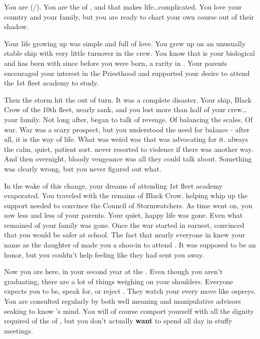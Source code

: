 \documentclass[char]{GL2020}
\begin{document}
\name{\cWarlordDaughter{}}

You are \cWarlordDaughter{} (\cWarlordDaughter{\They}/\cWarlordDaughter{\Them}). You are the \cWarlordDaughter{\child} of \cLoud{\full}, and that makes life\ldots complicated. You love your country and your family, but you are ready to chart your own course out of their shadow.

Your life growing up was simple and full of love. You grew up on an unusually stable ship with very little turnover in the crew. You know that \cLoud{} is your biological \cLoud{\parent} and has been with \cQuiet{\full} since before you were born, a rarity in \pShip{}. Your parents encouraged your interest in the Priesthood and supported your desire to attend the 1st fleet academy to study.

Then the storm hit the \pShip{} out of turn. It was a complete disaster. Your ship, Black Crow of the 10th fleet, nearly sank, and you lost more than half of your crew\ldots your family. Not long after, \cLoud{} began to talk of revenge. Of balancing the scales. Of war. War was a scary prospect, but you understood the need for balance - after all, it is the \pShippies{} way of life. What was weird was that \cLoud{} was advocating for it. \cLoud{\They} \cLoud{\were} always the calm, quiet, patient sort. \cLoud{\They} never resorted to violence if there was another way. And then overnight, bloody vengeance was all they could talk about. Something was clearly wrong, but you never figured out what.

In the wake of this change, your dreams of attending 1st fleet academy evaporated. You traveled with the remains of Black Crow, helping \cLoud{} whip up the support \cLoud{\they} needed to convince the Council of Stormwatchers. As time went on, you saw less and less of your parents. Your quiet, happy life was gone. Even what remained of your family was gone. Once the war started in earnest, \cQuiet{} convinced \cLoud{} that you would be safer at school. The fact that nearly everyone in \pShip{} knew your name as the daughter of \cLoud{} made you a shoo-in to attend \pSchool{}. It was supposed to be an honor, but you couldn’t help feeling like they had sent you away.

Now you are here, in your second year at the \pSc{}. Even though you aren’t graduating, there are a lot of things weighing on your shoulders. Everyone expects you to be, speak for, or reject \cLoud{}. They watch your every move like ospreys. You are consulted regularly by both well meaning and manipulative advisors seaking to know \cLoud{}’s mind. You will of course comport yourself with all the dignity required of the \cWarlordDaughter{\child} of \cLoud{\full}, but you don't actually \textbf{want} to spend all day in stuffy meetings.
\end{document}
